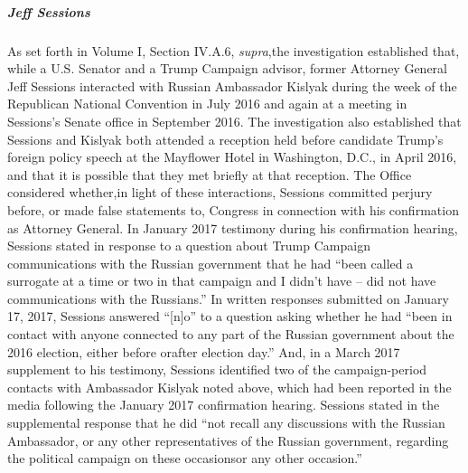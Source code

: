 
\subparagraph{Jeff Sessions}
As set forth in Volume I, Section IV.A.6, \textit{supra},the investigation established that, while a U.S. Senator and a Trump Campaign advisor, former Attorney General Jeff Sessions interacted with Russian Ambassador Kislyak during the week of the Republican National Convention in July 2016 and again at a meeting in Sessions's Senate office in September 2016. 
The investigation also established that Sessions and Kislyak both attended a reception held before candidate Trump's foreign policy speech at the Mayflower Hotel in Washington, D.C., in April 2016, and that it is possible that they met briefly at that reception.
The Office considered whether,in light of these interactions, Sessions committed perjury before, or made false statements to, Congress in connection with his confirmation as Attorney General. 
In January 2017 testimony during his confirmation hearing, Sessions stated in response to a question about Trump Campaign communications with the Russian government that he had ``been called a surrogate at a time or two in that campaign and I didn't have -- did not have communications with the Russians.'' 
In written responses submitted on January 17, 2017, Sessions answered ``[n]o'' to a question asking whether he had ``been in contact with anyone connected to any part of the Russian government about the 2016 election, either before orafter election day.'' 
And, in a March 2017 supplement to his testimony, Sessions identified two of the campaign-period contacts with Ambassador Kislyak noted above, which had been reported in the media following the January 2017 confirmation hearing. 
Sessions stated in the supplemental response that he did ``not recall any discussions with the Russian Ambassador, or any other representatives of the Russian government, regarding the political campaign on these occasionsor any other occasion.''

